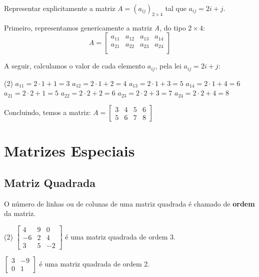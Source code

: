\begin{exercise}
	Representar explicitamente a matriz $A = (a_{ij})_{2 \times 4}$ tal que $a_{ij} = 2i + j$.

	Primeiro, representamos genericamente a matriz \textit{A}, do tipo $2 \times 4$:
	\begin{equation*}
		A = \begin{bmatrix}
			a_{11} & a_{12} & a_{13} & a_{14} \\
			a_{21} & a_{22} & a_{23} & a_{24} \\
		\end{bmatrix}
	\end{equation*}

	A seguir, calculamos o valor de cada elemento $a_{ij}$, pela lei $a_{ij} = 2i + j$:

	\begin{tasks}(2)
		\task[] $a_{11} = 2 \cdot 1 + 1 = 3$
		\task[] $a_{12} = 2 \cdot 1 + 2 = 4$
		\task[] $a_{13} = 2 \cdot 1 + 3 = 5$
		\task[] $a_{14} = 2 \cdot 1 + 4 = 6$
		\task[] $a_{21} = 2 \cdot 2 + 1 = 5$
		\task[] $a_{22} = 2 \cdot 2 + 2 = 6$
		\task[] $a_{23} = 2 \cdot 2 + 3 = 7$
		\task[] $a_{24} = 2 \cdot 2 + 4 = 8$
	\end{tasks}

	Concluindo, temos a matriz: $A = \begin{bmatrix}
			3 & 4 & 5 & 6 \\
			5 & 6 & 7 & 8
		\end{bmatrix}$
\end{exercise}

\section{Matrizes Especiais}

\subsection{Matriz Quadrada}


O número de linhas ou de colunas de uma matriz quadrada é chamado de \textbf{ordem} da matriz.

\begin{examples}\leavevmode
	\begin{tasks}(2)
		\task $\begin{bmatrix}
				4  & 9 & 0  \\
				-6 & 2 & 4  \\
				3  & 5 & -2
			\end{bmatrix}$
		é uma matriz quadrada de ordem 3.

		\task $\begin{bmatrix}
				3 & -9 \\
				0 & 1
			\end{bmatrix}$
		é uma matriz quadrada de ordem 2.
	\end{tasks}
\end{examples}

